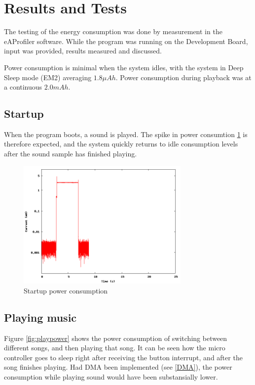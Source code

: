\section{Results and Tests}

The testing of the energy consumption was done by measurement in the eAProfiler software.
While the program was running on the Development Board, input was provided, results measured and discussed.

Power consumption is minimal when the system idles, with the system in Deep Sleep mode (EM2) averaging $ 1.8 \mu Ah $. Power consumption during playback was at a continuous $ 2.0 mAh $.

\subsection{Startup}

When the program boots, a sound is played. The spike in power consumtion \ref{fig:startuppower} is therefore expected, and the system quickly returns to idle consumption levels after the sound sample has finished playing.

\begin{figure}[H]
\centering
\includegraphics[width=0.75\textwidth]{data/startup.png}
\caption{Startup power consumption}
\label{fig:startuppower}
\end{figure}

\subsection{Playing music}

Figure \ref{fig:playpower} shows the power consumption of switching between different songs, and then playing that song.
It can be seen how the micro controller goes to sleep right after receiving the button interrupt, and after the song finishes playing.
Had DMA been implemented (see \vref{DMA}), the power consumption while playing sound would have been substansially lower.

